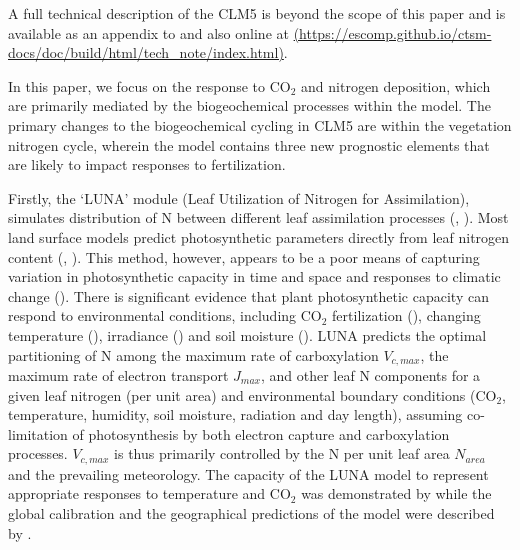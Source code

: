 \documentclass[draft,linenumbers]{agujournal}
\begin{document}
 A full technical description of the CLM5 is beyond the scope of this paper and is available as an appendix to \cite{lawrence2018} and also online at \url{(https://escomp.github.io/ctsm-docs/doc/build/html/tech_note/index.html)}.

In this paper, we focus on the response to CO$_{2}$ and nitrogen deposition, which are primarily mediated by the biogeochemical processes within the model. The primary changes to the biogeochemical cycling in CLM5 are within the vegetation nitrogen cycle, wherein the model contains three new prognostic elements that are likely to impact responses to fertilization.

Firstly, the  `LUNA' module (Leaf Utilization of Nitrogen for Assimilation),  simulates distribution of N between different leaf assimilation processes (\cite{xu2012}, \cite{ali2016}). Most land surface models predict photosynthetic parameters directly from leaf nitrogen content (\cite{kattge2009}, \cite{bonan2012}). This method, however, appears to be a poor means of capturing variation in photosynthetic capacity in time and space and responses to climatic change (\cite{walker2017}). There is significant evidence that plant photosynthetic capacity can respond to environmental conditions, including CO$_{2}$ fertilization (\cite{ainsworth2007}), changing temperature (\cite{hikosaka2005}), irradiance (\cite{niinemets1998}) and soil moisture (\cite{keenan2009}).  LUNA predicts the optimal partitioning of N among the maximum rate of carboxylation $V_{c,max}$, the maximum rate of electron transport $J_{max}$, and other leaf N components for a given leaf nitrogen (per unit area) and environmental boundary conditions (CO$_{2}$, temperature, humidity, soil moisture, radiation and day length), assuming co-limitation of photosynthesis by both electron capture and carboxylation processes.  $V_{c,max}$ is thus primarily controlled by the N per unit leaf area $N_{area}$ and the prevailing meteorology. The capacity of the LUNA model to represent appropriate responses to temperature and CO$_{2}$ was demonstrated by \cite{xu2012} while the global calibration and the geographical predictions of the model were described by \cite{ali2016}.
\end{document}
